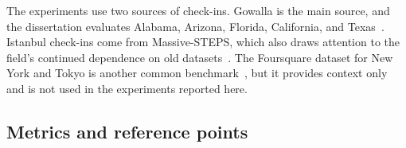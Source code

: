 The experiments use two sources of check-ins. Gowalla is the main source, and the
dissertation evaluates Alabama, Arizona, Florida, California, and
Texas~\cite{cho2011gowalla}. Istanbul check-ins come from Massive-STEPS, which also
draws attention to the field's continued dependence on old
datasets~\cite{wongso2025massivesteps}. The Foursquare dataset for New York and Tokyo
is another common benchmark~\cite{yang2015tsmc}, but it provides context only and is
not used in the experiments reported here.

\subsection{Metrics and reference points}

